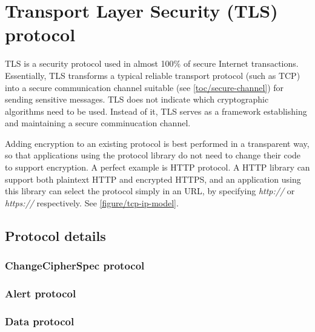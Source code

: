 \chapter{Transport Layer Security (TLS) protocol}



TLS is a security protocol used in almost 100\% of secure Internet transactions. Essentially, TLS transforms a typical reliable transport protocol (such as TCP) into a secure communication channel suitable (see \autoref{toc/secure-channel}) for sending sensitive messages. TLS does not indicate which cryptographic algorithms need to be used. Instead of it, TLS serves as a framework establishing and maintaining a secure comminucation channel.

Adding encryption to an existing protocol is best performed in a transparent way, so that applications using the protocol library do not need to change their code to support encryption. A perfect example is HTTP protocol. A HTTP library can support both plaintext HTTP and encrypted HTTPS, and an application using this library can select the protocol simply in an URL, by specifying \textit{http://} or \textit{https://} respectively. See \autoref{figure/tcp-ip-model}.






\section{Protocol details}



\subsection{ChangeCipherSpec protocol}
\subsection{Alert protocol}
\subsection{Data protocol}


